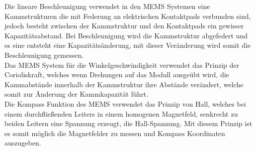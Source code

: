 Die lineare Beschleunigung\protect{} verwendet in den MEMS Systemen eine Kammstrukturen die mit Federung an elektrischen Kontaktpads verbunden sind, jedoch besteht zwischen der Kammstruktur und den Kontaktpads ein gewisser Kapazitätsabstand. Bei Beschleunigung wird die Kammstruktur abgefedert und es eine entsteht eine Kapazitätsänderung, mit dieser Veränderung wird somit die Beschleunigung gemessen.\parencite{web:BoschBMI}
\\
Das MEMS System für die Winkelgeschwindigkeit\protect{} verwendet das Prinzip der Corioliskraft, welches wenn Drehungen auf das Modull ausgeübt wird, die Kammabstände innerhalb der Kammstruktur ihre Abstände verändert, welche somit zur Änderung der Kammkapazität führt.\parencite{web:BoschBMI}
\\
Die Kompass Funktion des MEMS\protect{} verwendet das Prinzip von Hall, welches bei einem durchfließenden Leiters in einem homogenen Magnetfeld, senkrecht zu beiden Leitern eine Spannung erzeugt, die Hall-Spannung. Mit diesem Prinzip ist es somit möglich die Magnetfelder zu messen und Kompass Koordinaten auszugeben.\parencite{web:BoschBMI}


